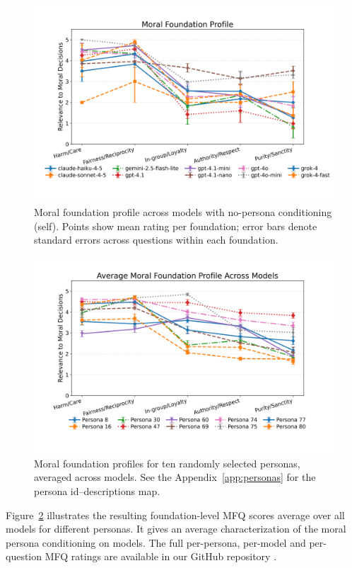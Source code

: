 \documentclass{article}
\begin{document}
\begin{figure}[t]
  \centering
  \includegraphics[width=\linewidth]{../results/moral_foundations_relevance_profiles.png}
  \caption{Moral foundation profile across models with no-persona conditioning (self). Points show mean rating per foundation; error bars denote standard errors across questions within each foundation.}
  \label{fig:mfq-profiles}
\end{figure}

\begin{figure}[t]
  \centering
  \includegraphics[width=\linewidth]{../results/persona_moral_foundations_relevance_profiles.png}
  \caption{Moral foundation profiles for ten randomly selected personas, averaged across models. See the Appendix~\ref{app:personas} for the persona id--descriptions map.}
  \label{fig:persona-mfq-profiles}
\end{figure}

Figure~\ref{fig:persona-mfq-profiles} illustrates the resulting foundation-level MFQ scores average over all models for different personas. It gives an average characterization of the moral persona conditioning on models. The full per-persona, per-model and per-question MFQ ratings are available in our GitHub repository \cite{costa2025llmms}.
\end{document}
